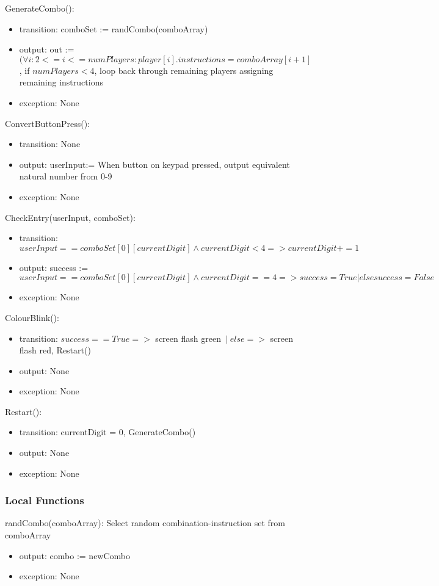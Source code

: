\documentclass[12pt, titlepage]{article}
\begin{document}
\noindent GenerateCombo():
\begin{itemize}
\item transition: comboSet := randCombo(comboArray)
\item output: out := $ (\forall i : 2<=i<=numPlayers : player[i].instructions = comboArray[i+1]$, if $numPlayers<4$, loop back through remaining players assigning remaining instructions
\item exception: None
\end{itemize}

\noindent ConvertButtonPress():
\begin{itemize}
\item transition: None
\item output: userInput:= When button on keypad pressed, output equivalent natural number from 0-9
\item exception: None
\end{itemize}

\noindent CheckEntry(userInput, comboSet):
\begin{itemize}
\item transition: $userInput == comboSet[0][currentDigit] \land currentDigit<4 => currentDigit+=1$
\item output: success := $userInput == comboSet[0][currentDigit] \land currentDigit==4 => success=True | else success = False$
\item exception: None
\end{itemize}

\noindent ColourBlink():
\begin{itemize}
\item transition: $success == True =>$ screen flash green $\: | \: else =>$ screen flash red, Restart()
\item output: None
\item exception: None
\end{itemize}

\noindent Restart():
\begin{itemize}
\item transition: currentDigit = 0, GenerateCombo()
\item output: None
\item exception: None
\end{itemize}


\subsubsection{Local Functions}
randCombo(comboArray): Select random combination-instruction set from comboArray
\begin{itemize}
    \item output: combo := newCombo
    \item exception: None
\end{itemize}
\end{document}
